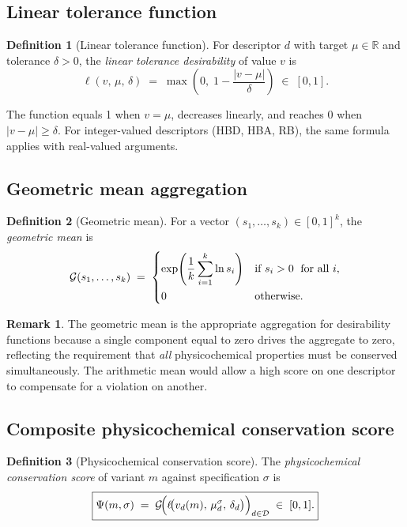 \documentclass[11pt, a4paper]{article}
\theoremstyle{definition}
\newtheorem{definition}{Definition}[section]
\newtheorem{remark}{Remark}[section]
\newcommand{\1}[1]{\mathbf{1}\!\left[#1\right]}   %
\newcommand{\Geo}{\mathcal{G}}                      %
\newcommand{\Desc}{\mathcal{D}}                     %
\begin{document}
\subsection{Linear tolerance function}

\begin{definition}[Linear tolerance function]
\label{def:linear-tol}
For descriptor $d$ with target $\mu \in \mathbb{R}$ and tolerance
$\delta > 0$, the \emph{linear tolerance desirability} of value $v$ is
\[
  \ell(v,\, \mu,\, \delta)
  \;=\; \max\!\left(0,\; 1 - \frac{|v - \mu|}{\delta}\right) \;\in\; [0, 1].
\]
\end{definition}

The function equals 1 when $v = \mu$, decreases linearly, and reaches 0
when $|v - \mu| \geq \delta$.
For integer-valued descriptors (HBD, HBA, RB), the same formula applies
with real-valued arguments.

\subsection{Geometric mean aggregation}

\begin{definition}[Geometric mean]
\label{def:geomean}
For a vector $(s_1, \ldots, s_k) \in [0,1]^k$, the \emph{geometric mean} is
\[
  \Geo(s_1, \ldots, s_k)
  \;=\; \begin{dcases}
    \exp\!\left(\frac{1}{k}\sum_{i=1}^k \ln s_i\right)
      & \text{if } s_i > 0 \;\text{ for all } i, \\
    0 & \text{otherwise.}
  \end{dcases}
\]
\end{definition}

\begin{remark}
The geometric mean is the appropriate aggregation for desirability functions
because a single component equal to zero drives the aggregate to zero,
reflecting the requirement that \emph{all} physicochemical properties must
be conserved simultaneously. The arithmetic mean would allow a high score on
one descriptor to compensate for a violation on another.
\end{remark}

\subsection{Composite physicochemical conservation score}

\begin{definition}[Physicochemical conservation score]
\label{def:desirability}
The \emph{physicochemical conservation score} of variant $m$ against
specification $\sigma$ is
\[
  \boxed{
    \Psi(m, \sigma)
    \;=\; \Geo\!\Bigl(\ell\!\bigl(v_d(m),\, \mu_d^\sigma,\, \delta_d\bigr)\Bigr)_{d \in \Desc}
    \;\in\; [0, 1].
  }
\]
\end{definition}
\end{document}
